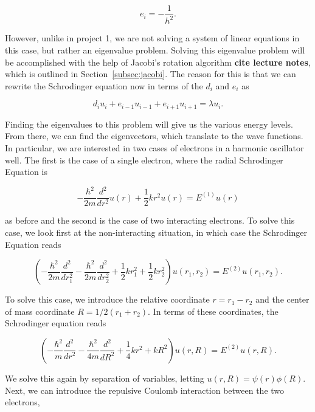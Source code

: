 \documentclass[12pt]{article}
\numberwithin{equation}{section}
\begin{document}
$$e_{i}=-\frac{1}{h^{2}}.$$

\noindent However, unlike in project 1, we are not solving a system of linear equations in this case, but rather an eigenvalue problem.  Solving this eigenvalue problem will be accomplished with the help of Jacobi's rotation algorithm \textbf{cite lecture notes}, which is outlined in Section~\ref{subsec:jacobi}.  The reason for this is that we can rewrite the Schrodinger equation now in terms of the $d_{i}$ and $e_{i}$ as 

$$d_{i}u_{i}+e_{i-1}u_{i-1}+e_{i+1}u_{i+1}=\lambda u_{i}.$$

\noindent Finding the eigenvalues to this problem will give us the various energy levels.  From there, we can find the eigenvectors, which translate to the wave functions.
\\\indent In particular, we are interested in two cases of electrons in a harmonic oscillator well.  The first is the case of a single electron, where the radial Schrodinger Equation is 

\begin{equation}
\label{eq:schrod1e}
-\frac{\hbar^{2}}{2m}\frac{d^{2}}{dr^{2}}u\left(r\right)+\frac{1}{2}kr^{2}u\left(r\right)=E^{\left(1\right)}u\left(r\right)
\end{equation}

\noindent as before and the second is the case of two interacting electrons.  To solve this case, we look first at the non-interacting situation, in which case the Schrodinger Equation reads

\begin{equation}
\label{eq:schrod2e}
\left(-\frac{\hbar^{2}}{2m}\frac{d^{2}}{dr_{1}^{2}}-\frac{\hbar^{2}}{2m}\frac{d^{2}}{dr_{2}^2}+\frac{1}{2}kr_{1}^2+\frac{1}{2}kr_{2}^2\right)u\left(r_{1},r_{2}\right)=E^{\left(2\right)}u\left(r_{1},r_{2}\right).
\end{equation}

\noindent To solve this case, we introduce the relative coordinate $r=r_{1}-r_{2}$ and the center of mass coordinate $R=1/2\left(r_{1}+r_{2}\right)$.  In terms of these coordinates, the Schrodinger equation reads

\begin{equation}
\left(-\frac{\hbar^{2}}{m}\frac{d^{2}}{dr^{2}}-\frac{\hbar^{2}}{4m}\frac{d^{2}}{dR^{2}}+\frac{1}{4}kr^{2}+kR^{2}\right)u\left(r,R\right)=E^{\left(2\right)}u\left(r,R\right).
\end{equation}

\noindent We solve this again by separation of variables, letting $u\left(r,R\right)=\psi\left(r\right)\phi\left(R\right)$.  
\\\indent Next, we can introduce the repulsive Coulomb interaction between the two electrons,
\end{document}

